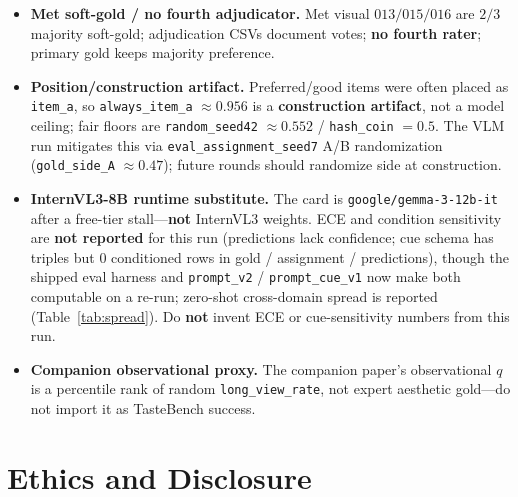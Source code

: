 \documentclass[11pt,a4paper]{article}
\begin{document}
\begin{itemize}[leftmargin=*,itemsep=3pt]
  \item \textbf{Met soft-gold / no fourth adjudicator.} Met visual $013/015/016$ are $2/3$ majority soft-gold; adjudication CSVs document votes; \textbf{no fourth rater}; primary gold keeps majority preference.
  \item \textbf{Position/construction artifact.} Preferred/good items were often placed as \texttt{item\_a}, so \texttt{always\_item\_a} $\approx 0.956$ is a \textbf{construction artifact}, not a model ceiling; fair floors are \texttt{random\_seed42} $\approx 0.552$ / \texttt{hash\_coin} $= 0.5$. The VLM run mitigates this via \texttt{eval\_assignment\_seed7} A/B randomization (\texttt{gold\_side\_A} $\approx 0.47$); future rounds should randomize side at construction.
  \item \textbf{InternVL3-8B runtime substitute.} The card is \texttt{google/gemma-3-12b-it} after a free-tier stall---\textbf{not} InternVL3 weights. ECE and condition sensitivity are \textbf{not reported} for this run (predictions lack confidence; cue schema has triples but $0$ conditioned rows in gold / assignment / predictions), though the shipped eval harness and \texttt{prompt\_v2} / \texttt{prompt\_cue\_v1} now make both computable on a re-run; zero-shot cross-domain spread is reported (Table~\ref{tab:spread}). Do \textbf{not} invent ECE or cue-sensitivity numbers from this run.
  \item \textbf{Companion observational proxy.} The companion paper's observational $q$ is a percentile rank of random \texttt{long\_view\_rate}, not expert aesthetic gold---do not import it as TasteBench success.
\end{itemize}

\section{Ethics and Disclosure}
\label{sec:ethics}
\end{document}
